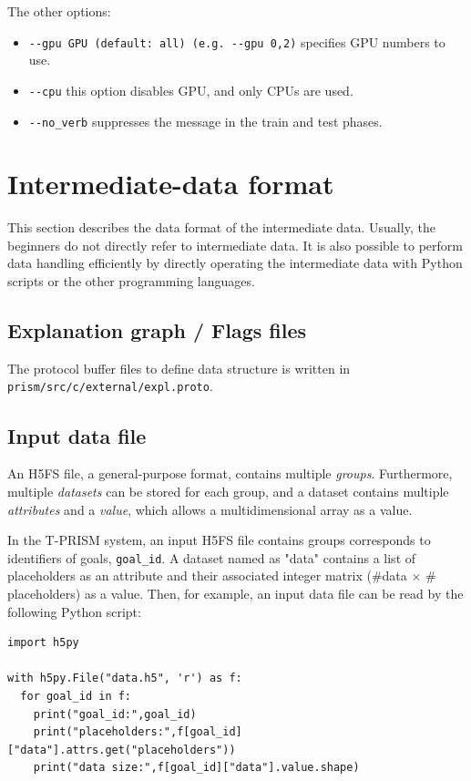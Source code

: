 \documentclass[a4paper]{report}
\begin{document}
The other options:
\begin{itemize}
	\item \verb|--gpu GPU (default: all) (e.g. --gpu 0,2)|
	specifies GPU numbers to use.
	\item \verb|--cpu|
	this option disables GPU, and only CPUs are used.
	\item \verb|--no_verb| suppresses the message in the train and test phases.
\end{itemize}






\section{Intermediate-data format}
\label{sec:intermediate_data}

This section describes the data format of the intermediate data.
Usually, the beginners do not directly refer to intermediate data.
It is also possible to perform data handling efficiently by directly operating the intermediate data with Python scripts or the other programming languages.

\subsection{Explanation graph / Flags files}
The protocol buffer files to define data structure is written in 
\verb|prism/src/c/external/expl.proto|.

\subsection{Input data file}

An H5FS file, a general-purpose format, contains multiple {\it groups}.
Furthermore, multiple {\it datasets} can be stored for each group, and a dataset contains multiple {\it attributes} and a {\it value}, which allows a multidimensional array as a value.

In the T-PRISM system, an input H5FS file contains groups corresponds to identifiers of goals, {\tt goal\_id}.
A dataset named as "data" contains a list of placeholders as an attribute
and their associated integer matrix ($\#$data $\times$  $\#$placeholders) as  a value.
Then, for example, an input data file can be read by the following Python script: 
\begin{verbatim}
import h5py

with h5py.File("data.h5", 'r') as f:
  for goal_id in f:
    print("goal_id:",goal_id)
    print("placeholders:",f[goal_id]["data"].attrs.get("placeholders"))
    print("data size:",f[goal_id]["data"].value.shape)
\end{verbatim}
\end{document}
